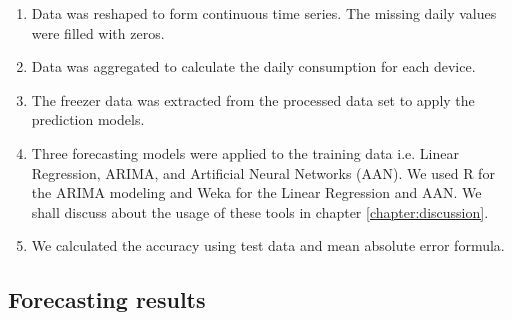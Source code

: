 \begin{enumerate}
\item Data was reshaped to form continuous time series. The missing daily values were filled with zeros.
\item Data was aggregated to calculate the daily consumption for each device.
\item  The freezer data was extracted from the processed data set to apply the prediction models.
\item  Three forecasting models were applied to the training data i.e. Linear Regression, ARIMA, and Artificial Neural Networks (AAN). We used R for the ARIMA modeling and Weka for the Linear Regression and AAN. We shall discuss about the usage of these tools in chapter \ref{chapter:discussion}. 
\item We calculated the accuracy using test data and mean absolute error formula.  
\end{enumerate} 

\subsection{Forecasting results}

